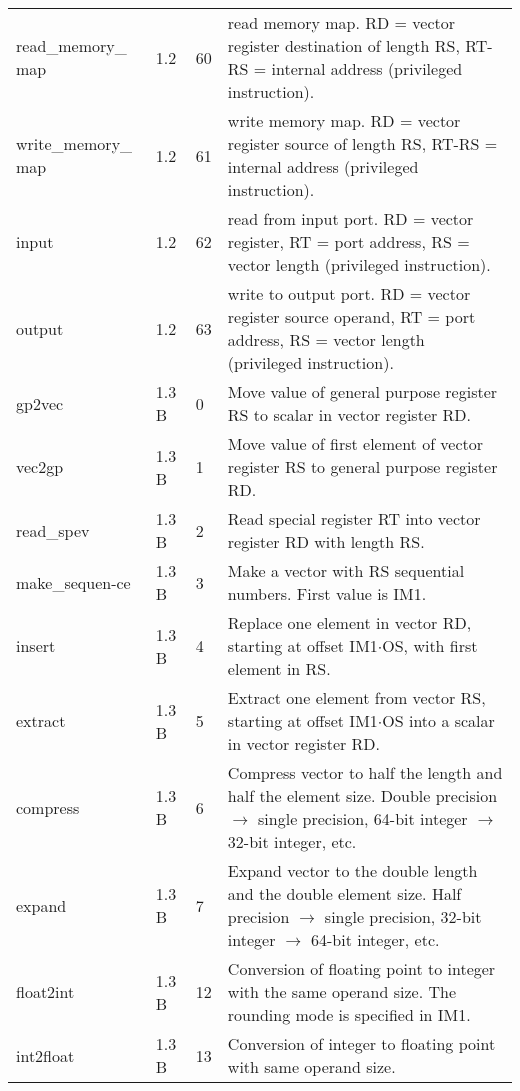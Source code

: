\documentclass[forwardcom.tex]{subfiles}
\begin{document}
\begin{longtable} {|p{25mm}|p{12mm}|p{12mm}|p{95mm}|}
read\_memory\_ map & 1.2 & 60 & read memory map. RD = vector register destination of length RS, RT-RS = internal address (privileged instruction). \\
write\_memory\_ map & 1.2 & 61 & write memory map. RD = vector register source of length RS, RT-RS = internal address (privileged instruction). \\

input         & 1.2 & 62 & read from input port. RD = vector register, RT = port address, RS = vector length (privileged instruction). \\
output        & 1.2 & 63 & write to output port. RD = vector register source operand, RT = port address, RS = vector length (privileged instruction). \\

gp2vec        & 1.3 B &  0 & Move value of general purpose register RS to scalar in vector register RD. \\

vec2gp        & 1.3 B &  1 & Move value of first element of vector register RS to general purpose register RD. \\

read\_spev    & 1.3 B &  2 & Read special register RT into vector register RD with  length RS. \\

make\_sequen-ce& 1.3 B & 3 & Make a vector with RS sequential numbers. First value is IM1. \\

insert        & 1.3 B &  4 & Replace one element in vector RD, starting at offset IM1$\cdot$OS, with first element in RS. \\

extract       & 1.3 B & 5 & Extract one element from vector RS, starting at offset IM1$\cdot$OS into a scalar in vector register RD. \\

compress      & 1.3 B &  6 & Compress vector to half the length and half the element size. Double precision $\rightarrow$ single precision, 64-bit
integer $\rightarrow$ 32-bit integer, etc. \\

expand        & 1.3 B &  7 & Expand vector to the double length and the double element size. Half precision $\rightarrow$ single precision, 32-bit integer $\rightarrow$ 64-bit integer, etc. \\

float2int     & 1.3 B & 12 & Conversion of floating point to integer with the same operand size. The rounding mode is specified in IM1. \\
int2float     & 1.3 B & 13 & Conversion of integer to floating point with same operand size. \\


\end{longtable}
\end{document}
